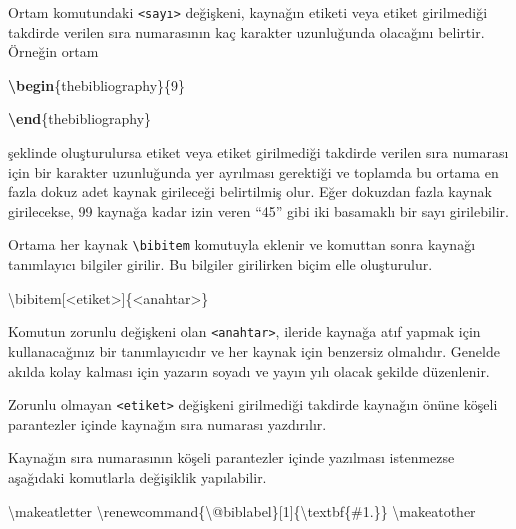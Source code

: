\documentclass[
  10pt,
]{scrbook}
\newenvironment{Shaded}{\begin{snugshade}}{\end{snugshade}}
\newcommand{\ExtensionTok}[1]{#1}
\newcommand{\FunctionTok}[1]{\textcolor[rgb]{0.00,0.00,0.00}{#1}}
\newcommand{\KeywordTok}[1]{\textcolor[rgb]{0.13,0.29,0.53}{\textbf{#1}}}
\newcommand{\NormalTok}[1]{#1}
\theoremstyle{definition}
\theoremstyle{definition}
\theoremstyle{definition}
\theoremstyle{definition}
\theoremstyle{remark}
\begin{document}
Ortam komutundaki \texttt{\textless{}sayı\textgreater{}} değişkeni, kaynağın etiketi veya etiket girilmediği takdirde verilen sıra numarasının kaç karakter uzunluğunda olacağını belirtir. Örneğin ortam

\begin{Shaded}
\begin{Highlighting}[]
\KeywordTok{\textbackslash{}begin}\NormalTok{\{}\ExtensionTok{thebibliography}\NormalTok{\}\{9\}}
        
\KeywordTok{\textbackslash{}end}\NormalTok{\{}\ExtensionTok{thebibliography}\NormalTok{\}}
\end{Highlighting}
\end{Shaded}

şeklinde oluşturulursa etiket veya etiket girilmediği takdirde verilen sıra numarası için bir karakter uzunluğunda yer ayrılması gerektiği ve toplamda bu ortama en fazla dokuz adet kaynak girileceği belirtilmiş olur. Eğer dokuzdan fazla kaynak girilecekse, 99 kaynağa kadar izin veren ``45'' gibi iki basamaklı bir sayı girilebilir.

Ortama her kaynak \texttt{\textbackslash{}bibitem} komutuyla eklenir ve komuttan sonra kaynağı tanımlayıcı bilgiler girilir. Bu bilgiler girilirken biçim elle oluşturulur.

\begin{Shaded}
\begin{Highlighting}[]
\FunctionTok{\textbackslash{}bibitem}\NormalTok{[\textless{}etiket\textgreater{}]\{\textless{}anahtar\textgreater{}\}}
\end{Highlighting}
\end{Shaded}

Komutun zorunlu değişkeni olan \texttt{\textless{}anahtar\textgreater{}}, ileride kaynağa atıf yapmak için kullanacağınız bir tanımlayıcıdır ve her kaynak için benzersiz olmalıdır. Genelde akılda kolay kalması için yazarın soyadı ve yayın yılı olacak şekilde düzenlenir.

Zorunlu olmayan \texttt{\textless{}etiket\textgreater{}} değişkeni girilmediği takdirde kaynağın önüne köşeli parantezler içinde kaynağın sıra numarası yazdırılır.

Kaynağın sıra numarasının köşeli parantezler içinde yazılması istenmezse aşağıdaki komutlarla değişiklik yapılabilir.

\begin{Shaded}
\begin{Highlighting}[]
\FunctionTok{\textbackslash{}makeatletter}
\FunctionTok{\textbackslash{}renewcommand}\NormalTok{\{}\ExtensionTok{\textbackslash{}@biblabel}\NormalTok{\}[1]\{}\FunctionTok{\textbackslash{}textbf}\NormalTok{\{\#1.\}\}}
\FunctionTok{\textbackslash{}makeatother}
\end{Highlighting}
\end{Shaded}
\end{document}
